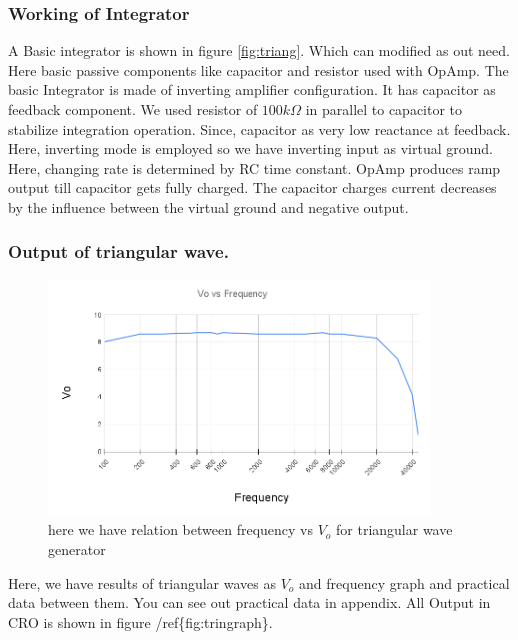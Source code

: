 \documentclass[14pt,a4paper]{extarticle}
\begin{document}
\subsubsection{Working of Integrator}
\label{sec:org410e7c3}

A Basic integrator is shown in figure \ref{fig:triang}. Which can modified as out need. Here basic passive components like capacitor and resistor used with OpAmp. The basic Integrator is made of inverting amplifier configuration. It has capacitor as feedback component. We used resistor of \(100k\Omega\) in parallel to capacitor to stabilize integration operation. Since, capacitor as very low reactance at feedback. Here, inverting mode is employed so we have inverting input as virtual ground. Here, changing rate is determined by RC time constant. OpAmp produces ramp output till capacitor gets fully charged. The capacitor charges current decreases by the influence between the virtual ground and negative output.


\subsubsection{Output of triangular wave.}
\label{sec:org80c2387}


\begin{figure}[H]
    \centering
    \includegraphics[width=0.9\textwidth]{imgs/triangraph.png}
    \caption{here we have relation between frequency vs $V_o$ for triangular wave generator}
    \label{fig:triangraph}
\end{figure}

Here, we have results of triangular waves as \(V_o\) and frequency graph and practical data between them. You can see out practical data in appendix. All Output in CRO is shown in figure /ref\{fig:tringraph\}. 
\end{document}
